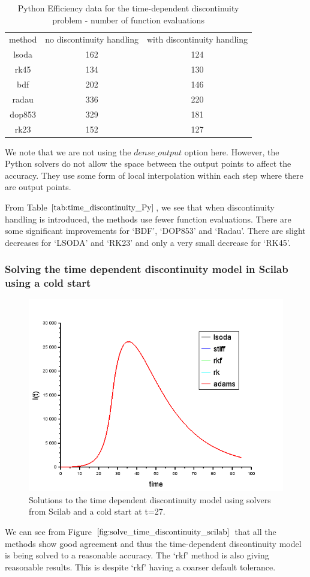 \begin{table}[H]
\caption {Python Efficiency data for the time-dependent discontinuity problem - number of function evaluations} 
\label{tab:time_discontinuity_Py} 
\begin{center}
\begin{tabular}{ c c c }
method & no discontinuity handling & with discontinuity handling \\ 
lsoda & 162 & 124 \\
rk45 & 134 & 130 \\
bdf & 202 & 146 \\
radau & 336 & 220 \\
dop853 & 329 & 181 \\
rk23 & 152 & 127 \\
\end{tabular}
\end{center}
\end{table}

We note that we are not using the $dense\_output$ option here. However, the Python solvers do not allow the space between the output points to affect the accuracy. They use some form of local interpolation within each step where there are output points.

From Table $\ref{tab:time_discontinuity_Py}$, we see that when discontinuity handling is introduced, the methods use fewer function evaluations. There are some significant improvements for `BDF', `DOP853' and `Radau'. There are slight decreases for `LSODA' and `RK23' and only a very small decrease for `RK45'. 

\subsubsection{Solving the time dependent discontinuity model in Scilab using a cold start} 
\begin{figure}[H]
\centering
\includegraphics[width=0.7\linewidth]{./figures/solve_time_discontinuity_scilab}
\caption{Solutions to the time dependent discontinuity model using solvers from Scilab and a cold start at t=27.}
\label{fig:solve_time_discontinuity_scilab}
\end{figure}
We can see from Figure $\ref{fig:solve_time_discontinuity_scilab}$ that all the methods show good agreement and thus the time-dependent discontinuity model is being solved to a reasonable accuracy. The `rkf' method is also giving reasonable results. This is despite `rkf' having a coarser default tolerance.

